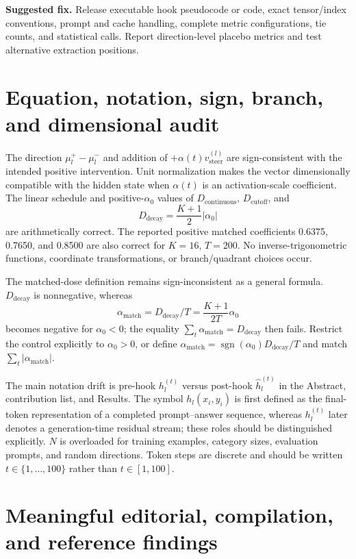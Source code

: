 \documentclass[11pt]{article}
\newcommand{\findinglabel}[1]{\textbf{#1}}
\begin{document}
\findinglabel{Suggested fix.} Release executable hook pseudocode or code, exact tensor/index conventions, prompt and cache handling, complete metric configurations, tie counts, and statistical calls.  Report direction-level placebo metrics and test alternative extraction positions.

\section*{Equation, notation, sign, branch, and dimensional audit}

The direction $\mu_l^+-\mu_l^-$ and addition of $+\alpha(t)v_{\text{steer}}^{(l)}$ are sign-consistent with the intended positive intervention.  Unit normalization makes the vector dimensionally compatible with the hidden state when $\alpha(t)$ is an activation-scale coefficient.  The linear schedule and positive-$\alpha_0$ values of $D_{\text{continuous}}$, $D_{\text{cutoff}}$, and
\[
D_{\text{decay}}=\frac{K+1}{2}|\alpha_0|
\]
are arithmetically correct.  The reported positive matched coefficients 0.6375, 0.7650, and 0.8500 are also correct for $K=16$, $T=200$.  No inverse-trigonometric functions, coordinate transformations, or branch/quadrant choices occur.

The matched-dose definition remains sign-inconsistent as a general formula.  $D_{\text{decay}}$ is nonnegative, whereas
\[
\alpha_{\text{match}}=D_{\text{decay}}/T
=\frac{K+1}{2T}\alpha_0
\]
becomes negative for $\alpha_0<0$; the equality $\sum_t\alpha_{\text{match}}=D_{\text{decay}}$ then fails.  Restrict the control explicitly to $\alpha_0>0$, or define $\alpha_{\text{match}}=\operatorname{sgn}(\alpha_0)D_{\text{decay}}/T$ and match $\sum_t|\alpha_{\text{match}}|$.

The main notation drift is pre-hook $h_l^{(t)}$ versus post-hook $\hat h_l^{(t)}$ in the Abstract, contribution list, and Results.  The symbol $h_l(x_i,y_i)$ is first defined as the final-token representation of a completed prompt--answer sequence, whereas $h_l^{(t)}$ later denotes a generation-time residual stream; these roles should be distinguished explicitly.  $N$ is overloaded for training examples, category sizes, evaluation prompts, and random directions.  Token steps are discrete and should be written $t\in\{1,\ldots,100\}$ rather than $t\in[1,100]$.

\section*{Meaningful editorial, compilation, and reference findings}
\end{document}
